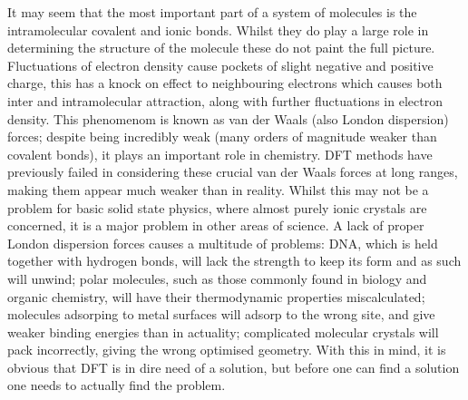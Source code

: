 \documentclass[10pt,a4paper,twocolumn,twoside]{extarticle}
\begin{document}
	It may seem that the most important part of a system of molecules is the intramolecular covalent and ionic bonds. Whilst they do play a large role in determining the structure of the molecule these do not paint the full picture. Fluctuations of electron density cause pockets of slight negative and positive charge, this has a knock on effect to neighbouring electrons which causes both inter and intramolecular attraction, along with further fluctuations in electron density. This phenomenom is known as van der Waals (also London dispersion) forces; despite being incredibly weak (many orders of magnitude weaker than covalent bonds), it plays an important role in chemistry. \cite{vdWImportance-Kaplan2006}
	DFT methods have previously failed in considering these crucial van der Waals forces at long ranges, making them appear much weaker than in reality. Whilst this may not be a problem for basic solid state physics, where almost purely ionic crystals are concerned, it is a major problem in other areas of science. A lack of proper London dispersion forces causes a multitude of problems: DNA, which is held together with hydrogen bonds, will lack the strength to keep its form and as such will unwind; polar molecules, such as those commonly found in biology and organic chemistry, will have their thermodynamic properties miscalculated; molecules adsorping to metal surfaces will adsorp to the wrong site, and give weaker binding energies than in actuality; complicated molecular crystals will pack incorrectly, giving the wrong optimised geometry.
	With this in mind, it is obvious that DFT is in dire need of a solution, but before one can find a solution one needs to actually find the problem. 
\end{document}
